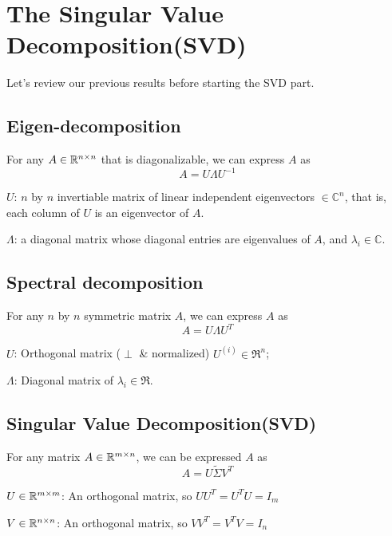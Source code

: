 \section{The Singular Value Decomposition(SVD)}

Let's review our previous results before starting the SVD part.

\subsection{Eigen-decomposition}

For any $A\in \mathbb{R}^{n\times n}$ that is diagonalizable,  we can express $A$ as 
\begin{equation*}
A = U\Lambda U^{-1}
\end{equation*}

$U$: $n$ by $n$ invertiable matrix of linear independent eigenvectors $\in \mathbb{C}^n$, that is, each column of $U$ is an eigenvector of $A$.

$\Lambda$: a diagonal matrix whose diagonal entries are eigenvalues of $A$, and $\lambda_i\in \mathbb{C}$.


\subsection{Spectral decomposition}

For any $n$ by $n$ symmetric matrix $A$, we can express $A$ as
\begin{equation*}
A = U\Lambda U^T
\end{equation*}

$U$: Orthogonal matrix ($\perp$ \& normalized) $U^{(i)}\in \Re^n$;

$\Lambda$: Diagonal matrix of $\lambda_i \in \Re$.



\subsection{Singular Value Decomposition(SVD)}

For any matrix $A\in \mathbb{R}^{m\times n}$, we can be expressed $A$ as 
\begin{equation*}
A =U\tilde{\Sigma} V^T
\end{equation*}

$U\in \mathbb{R}^{m\times m}$: An orthogonal matrix, so $UU^T =U^TU = I_m$

$V\in \mathbb{R}^{n\times n}$: An orthogonal matrix, so $VV^T = V^TV =I_n$

